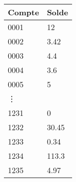 \begin{table}[]
  \begin{tabularx}{\textwidth}{X|l}
    \toprule
    Compte & Solde \\ \midrule
    0001   & 12    \\
    0002   & 3.42  \\
    0003   & 4.4   \\
    0004   & 3.6   \\
    0005   & 5     \\
    \vdots &       \\
    1231   & 0     \\
    1232   & 30.45 \\
    1233   & 0.34  \\
    1234   & 113.3 \\
    1235   & 4.97  \\ \bottomrule
  \end{tabularx}
\end{table}
